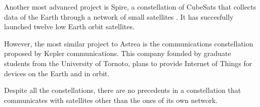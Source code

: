 Another most advanced project is Spire, a constellation of CubeSats that collects data of the Earth through a network of small satellites \cite{spire}. It has succesfully launched twelve low Earth orbit satellites.

However, the most similar project to Astrea is the communications constellation proposed by Kepler communications. This company founded by graduate students from the University of Tornoto, plans to provide Internet of Things for devices on the Earth and in orbit.

Despite all the constellations, there are no precedents in a constellation that communicates with satellites other than the ones of its own network.